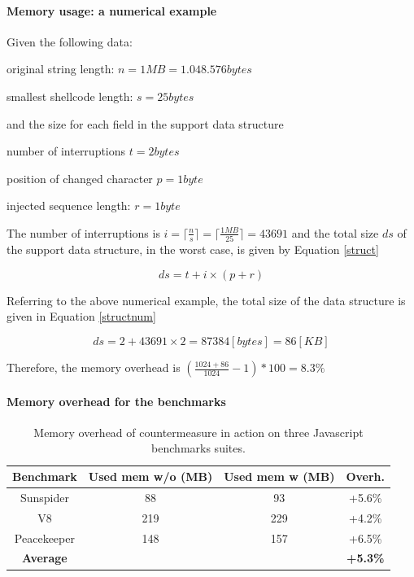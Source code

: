 \paragraph{Memory usage: a numerical example}

Given the following data:
\begin{description}
\item original string length:  $n = 1 MB = 1.048.576 bytes$ 
\item smallest shellcode length: $s = 25 bytes$ 
\end{description}

and the size for each field in the support data structure 
\begin{description}
\item number of interruptions $t = 2 bytes $
\item position of changed character $p=1 byte$
\item injected sequence length:  $r = 1  byte$ 
\end{description}

The number of interruptions is $i= \lceil \frac{n}{s} \rceil = \lceil \frac{1MB}{25} \rceil= 43691$ and the total size $ds$ of the support data structure, in the worst case, is given by Equation \ref{struct}


\begin{equation}\label{struct}
ds = t + i\times(p+r) 
\end{equation}

Referring to the above numerical example, the total size of the data structure is given in Equation \ref{structnum} 

\begin{equation}\label{structnum}
ds = 2 + 43691 \times 2 = 87384 [bytes] = 86 [KB] 
\end{equation}

Therefore, the memory overhead is $(\frac{1024 + 86}{1024} - 1)*100 = 8.3\% $

\paragraph{Memory overhead for the benchmarks}
\begin{table}[htdp]
\begin{center}
\begin{tabular}{|c|c|c|c|}
\hline
\bf{Benchmark} & \bf{Used mem w/o (MB)} & \bf{Used mem w (MB)}  & \bf{Overh.} \\
\hline
Sunspider   &    88      &    93      &  +5.6\% \\
V8          &    219     &    229     &  +4.2\% \\
Peacekeeper &    148     &    157     &  +6.5\% \\
\hline
\bf{Average}  &   &   & \bf{+5.3\%} \\
\hline
\end{tabular}
\end{center}
\caption{{ Memory overhead of countermeasure in action on three Javascript benchmarks suites.}}
\vspace{0.3cm}
\label{memory}
\end{table}


